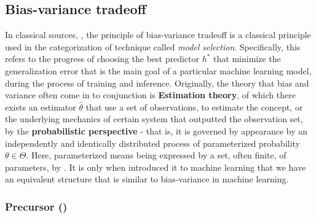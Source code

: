 \subsection{Bias-variance tradeoff}

In classical sources, \cite{James2021,goodfellow2016deep,STL_Hajek_Maxim_2021,10.5555/2371238,10.5555/2621980}, the principle of bias-variance tradeoff is a classical principle used in the categorization of technique called \textit{model selection}. Specifically, this refers to the progress of choosing the best predictor $h^{*}$ that minimize the generalization error that is the main goal of a particular machine learning model, during the process of training and inference. Originally, the theory that bias and variance often come in to conjunction is \textbf{Estimation theory}, of which there exists an estimator $\hat{\theta}$ that use a set of observations, to estimate the concept, or the underlying mechanics of certain system that outputted the observation set, by the \textbf{probabilistic perspective} - that is, it is governed by appearance by an independently and identically distributed process of parameterized probability $\theta\in \Theta$. Here, parameterized means being expressed by a set, often finite, of parameters, by \cite{LehmannCasella_theory_1998,liam_statistics_2005}. It is only when \cite{6797087} introduced it to machine learning that we have an equivalent structure that is similar to bias-variance in machine learning. 

\subsubsection{Precursor (\cite{6797087})}


